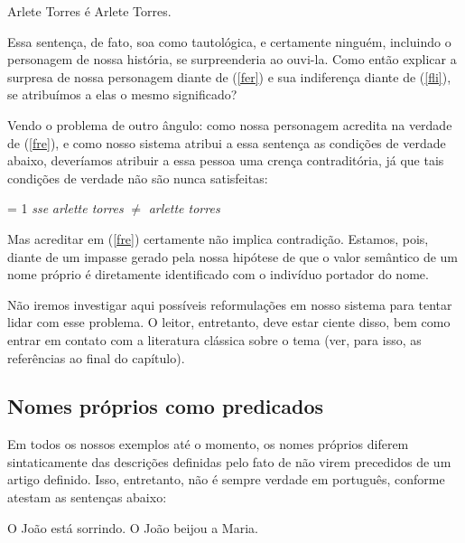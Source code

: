 \begin{exe}
	\ex Arlete Torres é Arlete Torres.\label{fli}
\end{exe}

\n Essa sentença, de fato, soa como tautológica, e certamente
ninguém, incluindo o personagem de nossa história, se
surpreenderia ao ouvi-la.  Como então explicar a surpresa de
nossa personagem diante de (\ref{fer}) e sua indiferença diante de
(\ref{fli}), se atribuímos a elas o mesmo significado?

Vendo o problema de outro ângulo: como nossa personagem
acredita na verdade de (\ref{fre}), e como nosso sistema atribui a
essa sentença as condições de verdade abaixo, deveríamos atribuir
a essa pessoa uma crença contraditória, já que
tais condições de verdade não são nunca satisfeitas:

\begin{exe}
	\ex \den{(\ref{fre})} = 1 \textit{sse} \textit{arlette torres} $\neq$ \textit{arlette torres}
\end{exe}

\n Mas acreditar em (\ref{fre}) certamente não implica
contradição. Estamos, pois, diante de um impasse gerado pela nossa
hipótese de que o valor semântico de um nome próprio é diretamente
identificado com o indivíduo portador do nome.

Não iremos investigar aqui possíveis reformulações em nosso
sistema para tentar lidar com esse problema. O leitor, entretanto,
deve estar ciente disso, bem como entrar em contato com a
literatura clássica sobre o tema (ver, para isso, as referências
ao final do capítulo). 



\subsection{Nomes próprios como predicados} 

\n Em todos os nossos exemplos até o momento, os nomes próprios
diferem sintaticamente das descrições definidas pelo fato de não
virem precedidos de um artigo definido. Isso, entretanto, não é
sempre verdade em português, conforme atestam as sentenças abaixo:

\begin{exe}
\ex\label{oj}
\begin{xlist}
\ex O João está sorrindo.\label{oja}
\ex O João beijou a Maria.\label{ojb}
\end{xlist}
\end{exe}

